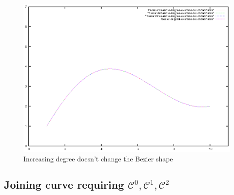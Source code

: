 \documentclass{article}
\begin{document}
\begin{figure}
  \centering
  \includegraphics{bezier-deCasteljau-curves/exercise-six-one-more-degree-comparison}
  \caption{Increasing degree doesn't change the Bezier shape}
  \label{fig:increasing-degree-does-change-curve}
\end{figure}

\subsection{Joining curve requiring $\mathcal{C}^0, \mathcal{C}^1, \mathcal{C}^2$}
\end{document}
